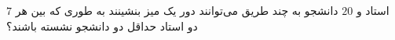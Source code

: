 \EXERCISE
$7$
استاد و 
$20$
دانشجو به چند طریق می‌توانند دور یک میز بنشینند به طوری که بین هر دو استاد حداقل دو دانشجو نشسته باشند؟